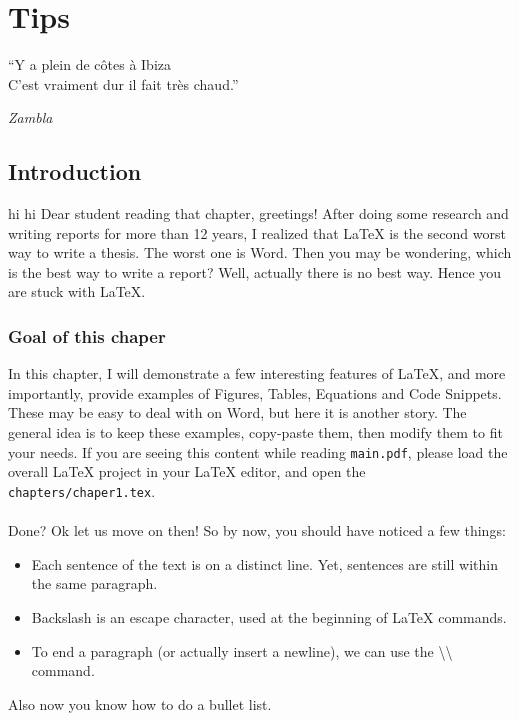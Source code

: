 
\chapter{Tips} %
\epigraph{``Y a plein de c\^otes \`a Ibiza\\C'est vraiment dur il fait tr\`es chaud.''}{\textit{Zambla}}

\label{chapter1} %

\section{Introduction}
hi hi
Dear student reading that chapter, greetings!
After doing some research and writing reports for more than 12 years, I realized that LaTeX is the second worst way to write a thesis.
The worst one is Word.
Then you may be wondering, which is the best way to write a report?
Well, actually there is no best way.
Hence you are stuck with LaTeX.

\subsection{Goal of this chaper}
In this chapter, I will demonstrate a few interesting features of LaTeX, and more importantly, provide examples of Figures, Tables, Equations and Code Snippets.
These may be easy to deal with on Word, but here it is another story.
The general idea is to keep these examples, copy-paste them, then modify them to fit your needs.
If you are seeing this content while reading \texttt{main.pdf}, please load the overall LaTeX project in your LaTeX editor, and open the \texttt{chapters/chaper1.tex}.
\\
\\
Done?
Ok let us move on then!
So by now, you should have noticed a few things:
\begin{itemize}
  \item Each sentence of the text is on a distinct line. Yet, sentences are still within the same paragraph.
  \item Backslash is an escape character, used at the beginning of LaTeX commands.
  \item To end a paragraph (or actually insert a newline), we can use the \textbackslash{}\textbackslash{} command.
\end{itemize}
Also now you know how to do a bullet list.


